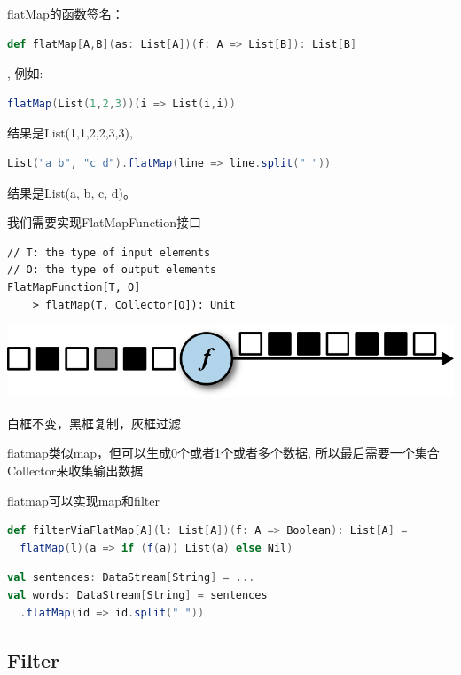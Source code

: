 \documentclass[oneside]{ctexbook}
\begin{document}
flatMap的函数签名：

\begin{lstlisting}[language=scala, breaklines]
def flatMap[A,B](as: List[A])(f: A => List[B]): List[B]
\end{lstlisting}

, 例如: 

\begin{lstlisting}[language=scala, breaklines]
flatMap(List(1,2,3))(i => List(i,i))
\end{lstlisting}

结果是List(1,1,2,2,3,3), 

\begin{lstlisting}[language=scala, breaklines]
List("a b", "c d").flatMap(line => line.split(" "))
\end{lstlisting}

结果是List(a, b, c, d)。

我们需要实现\colorbox{gray!20}{FlatMapFunction}接口

\begin{lstlisting}
// T: the type of input elements
// O: the type of output elements
FlatMapFunction[T, O]
    > flatMap(T, Collector[O]): Unit
\end{lstlisting}

\noindent \includegraphics[width=\textwidth]{flatmap.png}

白框不变，黑框复制，灰框过滤

flatmap类似map，但可以生成0个或者1个或者多个数据, 所以最后需要一个集合Collector来收集输出数据

flatmap可以实现map和filter

\begin{lstlisting}[language=scala, breaklines]
def filterViaFlatMap[A](l: List[A])(f: A => Boolean): List[A] =
  flatMap(l)(a => if (f(a)) List(a) else Nil)
\end{lstlisting}

\begin{lstlisting}[language=scala, breaklines]
val sentences: DataStream[String] = ...
val words: DataStream[String] = sentences
  .flatMap(id => id.split(" "))
\end{lstlisting}

\subsection{Filter}
\end{document}
